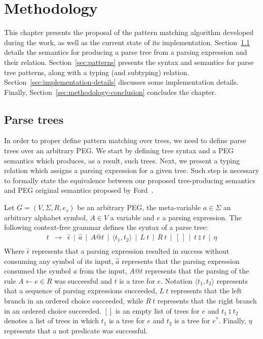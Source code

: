 \chapter{Methodology}\label{chap:methodology}

This chapter presents the proposal of the pattern matching algorithm developed
during the work, as well as the  current state of its implementation.
Section~\ref{sec:parse-tress} details the semantics for producing a parse tree
from a parsing expression and their relation. Section~\ref{sec:patterns} presents 
the syntax and semantics for parse tree patterns, along with a typing (and subtyping)
relation. Section~\ref{sec:implementation-details} discusses some implementation
details. Finally, Section~\ref{sec:methodology-conclusion} concludes the chapter.

\section{Parse trees}\label{sec:parse-tress}

In order to proper define pattern matching over trees, we need
to define parse trees over an arbitrary PEG. We start by defining
tree syntax and a PEG semantics which produces, as a result, such
trees. Next, we present a typing relation which assigns a parsing
expression for a given tree. Such step is necessary to formally
state the equivalence between our proposed tree-producing semantics
and PEG original semantics proposed by Ford~\cite{ford2004-peg}.

Let \(G = (V, \Sigma, R, e_s)\) be an arbitrary PEG, the meta-variable \(a \in \Sigma\) an
arbitrary alphabet symbol, \(A \in V\) a variable and \(e\) a parsing expression.
The following context-free grammar defines the syntax of a parse tree:
\[
   \begin{array}{lcl}
      t & \to & \hat{\epsilon} \, \mid \, \hat{a} \, \mid \, A@t\,
                    \mid \, \langle t_1, t_2 \rangle\,
                    \mid \, L\:t \, \mid \, R\:t \, \mid \, [\,] \,\mid\,t \typecolon t\,
                    \mid \, \eta \\
   \end{array}
\]
Where \(\hat{\epsilon}\) represents that a parsing expression resulted in
success without consuming any symbol of its input, \(\hat{a}\) represents that
the parsing expression consumed the symbol \(a\) from the input, \(A@t\)
represents that the parsing of the rule \(A \leftarrow e \in R\) was succeesful
and $t$ is a tree for $e$. Notation
\(\langle t_1, t_2 \rangle\) represents that a sequence of parsing expressions
succeeded,
\(L \: t\) represents that the left branch in an ordered choice succeeded, while
\(R \: t\) represents that the right branch in an ordered choice succeeded.
\([]\) is an empty list of trees for $e$ and \(t_1  \typecolon  t_2\) denotes a list of
trees in which $t_1$ is a tree for $e$ and $t_2$ is a tree for $e^*$. Finally,
\(\eta\) represents that a not predicate was successful.

